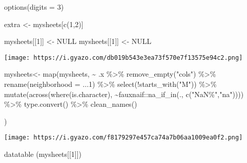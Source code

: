\documentclass[
]{article}
\newenvironment{Shaded}{\begin{snugshade}}{\end{snugshade}}
\newcommand{\AttributeTok}[1]{\textcolor[rgb]{0.77,0.63,0.00}{#1}}
\newcommand{\ConstantTok}[1]{\textcolor[rgb]{0.00,0.00,0.00}{#1}}
\newcommand{\DecValTok}[1]{\textcolor[rgb]{0.00,0.00,0.81}{#1}}
\newcommand{\FunctionTok}[1]{\textcolor[rgb]{0.00,0.00,0.00}{#1}}
\newcommand{\NormalTok}[1]{#1}
\newcommand{\OtherTok}[1]{\textcolor[rgb]{0.56,0.35,0.01}{#1}}
\newcommand{\SpecialCharTok}[1]{\textcolor[rgb]{0.00,0.00,0.00}{#1}}
\newcommand{\StringTok}[1]{\textcolor[rgb]{0.31,0.60,0.02}{#1}}
\begin{document}
\begin{Shaded}
\begin{Highlighting}[]
\FunctionTok{options}\NormalTok{(}\AttributeTok{digits =} \DecValTok{3}\NormalTok{)}


\NormalTok{extra }\OtherTok{\textless{}{-}}\NormalTok{ mysheets[}\FunctionTok{c}\NormalTok{(}\DecValTok{1}\NormalTok{,}\DecValTok{2}\NormalTok{)]}


\NormalTok{mysheets[[}\DecValTok{1}\NormalTok{]] }\OtherTok{\textless{}{-}} \ConstantTok{NULL}
\NormalTok{mysheets[[}\DecValTok{1}\NormalTok{]] }\OtherTok{\textless{}{-}} \ConstantTok{NULL}
\end{Highlighting}
\end{Shaded}

\texttt{[image: https://i.gyazo.com/db019b543e3ea73f570e7f13575e94c2.png]}

\begin{Shaded}
\begin{Highlighting}[]
\NormalTok{ mysheets}\OtherTok{\textless{}{-}} \FunctionTok{map}\NormalTok{(mysheets, }\SpecialCharTok{\textasciitilde{}}\NormalTok{ .x }\SpecialCharTok{\%\textgreater{}\%} \FunctionTok{remove\_empty}\NormalTok{(}\StringTok{"cols"}\NormalTok{)   }\SpecialCharTok{\%\textgreater{}\%}
     \FunctionTok{rename}\NormalTok{(}\AttributeTok{neighborhood =}\NormalTok{ ...}\DecValTok{1}\NormalTok{)   }\SpecialCharTok{\%\textgreater{}\%}
       \FunctionTok{select}\NormalTok{(}\SpecialCharTok{!}\FunctionTok{starts\_with}\NormalTok{(}\StringTok{"M"}\NormalTok{)) }\SpecialCharTok{\%\textgreater{}\%}
       \FunctionTok{mutate}\NormalTok{(}\FunctionTok{across}\NormalTok{(}\FunctionTok{where}\NormalTok{(is.character), }\SpecialCharTok{\textasciitilde{}}\NormalTok{fauxnaif}\SpecialCharTok{::}\FunctionTok{na\_if\_in}\NormalTok{(., }\FunctionTok{c}\NormalTok{(}\StringTok{"NaN\%"}\NormalTok{,}\StringTok{"na"}\NormalTok{))))  }\SpecialCharTok{\%\textgreater{}\%}
       \FunctionTok{type.convert}\NormalTok{() }\SpecialCharTok{\%\textgreater{}\%}
        \FunctionTok{clean\_names}\NormalTok{() }
     
\NormalTok{)}
\end{Highlighting}
\end{Shaded}

\texttt{[image: https://i.gyazo.com/f8179297e457ca74a7b06aa1009ea0f2.png]}

\begin{Shaded}
\begin{Highlighting}[]
\FunctionTok{datatable}\NormalTok{ (mysheets[[}\DecValTok{1}\NormalTok{]])}
\end{Highlighting}
\end{Shaded}
\end{document}

